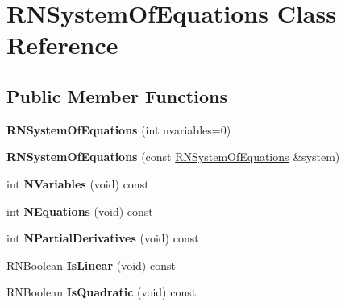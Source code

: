 \hypertarget{class_r_n_system_of_equations}{}\section{R\+N\+System\+Of\+Equations Class Reference}
\label{class_r_n_system_of_equations}
\subsection*{Public Member Functions}
\begin{DoxyCompactItemize}
\item 
{\bfseries R\+N\+System\+Of\+Equations} (int nvariables=0)\hypertarget{class_r_n_system_of_equations_a67ab2e33b233df6785049b2457c79c8d}{}\label{class_r_n_system_of_equations_a67ab2e33b233df6785049b2457c79c8d}

\item 
{\bfseries R\+N\+System\+Of\+Equations} (const \hyperlink{class_r_n_system_of_equations}{R\+N\+System\+Of\+Equations} \&system)\hypertarget{class_r_n_system_of_equations_a284a885c77e4f9f57581ec6c45c7b6ac}{}\label{class_r_n_system_of_equations_a284a885c77e4f9f57581ec6c45c7b6ac}

\item 
int {\bfseries N\+Variables} (void) const \hypertarget{class_r_n_system_of_equations_aa0bf9776d05f01718eeba059afcb386f}{}\label{class_r_n_system_of_equations_aa0bf9776d05f01718eeba059afcb386f}

\item 
int {\bfseries N\+Equations} (void) const \hypertarget{class_r_n_system_of_equations_a57fc4706e82f40321153b9743e373011}{}\label{class_r_n_system_of_equations_a57fc4706e82f40321153b9743e373011}

\item 
int {\bfseries N\+Partial\+Derivatives} (void) const \hypertarget{class_r_n_system_of_equations_a7c052a34b2bab4cba8ba11c9f050550d}{}\label{class_r_n_system_of_equations_a7c052a34b2bab4cba8ba11c9f050550d}

\item 
R\+N\+Boolean {\bfseries Is\+Linear} (void) const \hypertarget{class_r_n_system_of_equations_aa8e3762b772e25725f8ae4403bf8653e}{}\label{class_r_n_system_of_equations_aa8e3762b772e25725f8ae4403bf8653e}

\item 
R\+N\+Boolean {\bfseries Is\+Quadratic} (void) const \hypertarget{class_r_n_system_of_equations_ae378bf823fdcbd7ad3549ba55561fb9e}{}\label{class_r_n_system_of_equations_ae378bf823fdcbd7ad3549ba55561fb9e}


\end{DoxyCompactItemize}
